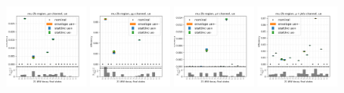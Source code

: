 \begin{figure}
    \includegraphics[width=0.24\textwidth]{chapters/Appendix/sectionTTSyst/figures/afterCorr/icata1_ch0_ue.png}
    \includegraphics[width=0.24\textwidth]{chapters/Appendix/sectionTTSyst/figures/afterCorr/icata1_ch1_ue.png}
    \includegraphics[width=0.24\textwidth]{chapters/Appendix/sectionTTSyst/figures/afterCorr/icata1_ch2_ue.png}
    \includegraphics[width=0.24\textwidth]{chapters/Appendix/sectionTTSyst/figures/afterCorr/icata1_ch3_ue.png}
    

\end{figure}
